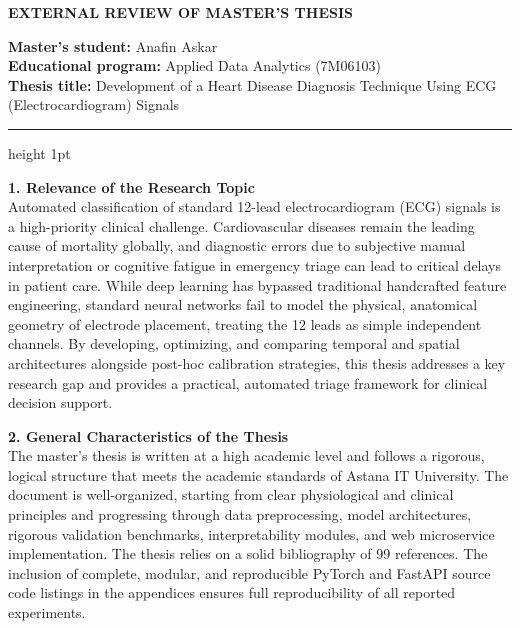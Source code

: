 \documentclass[12pt,a4paper]{article}
\begin{document}
\begin{center}
    \bfseries\large
    EXTERNAL REVIEW OF MASTER'S THESIS
\end{center}
\vspace{1em}

\noindent
\textbf{Master's student:} Anafin Askar \\
\textbf{Educational program:} Applied Data Analytics (7M06103) \\
\textbf{Thesis title:} Development of a Heart Disease Diagnosis Technique Using ECG (Electrocardiogram) Signals \\

\hrule height 1pt
\vspace{1.5em}

\noindent
\textbf{1. Relevance of the Research Topic} \\
Automated classification of standard 12-lead electrocardiogram (ECG) signals is a high-priority clinical challenge. Cardiovascular diseases remain the leading cause of mortality globally, and diagnostic errors due to subjective manual interpretation or cognitive fatigue in emergency triage can lead to critical delays in patient care. While deep learning has bypassed traditional handcrafted feature engineering, standard neural networks fail to model the physical, anatomical geometry of electrode placement, treating the 12 leads as simple independent channels. By developing, optimizing, and comparing temporal and spatial architectures alongside post-hoc calibration strategies, this thesis addresses a key research gap and provides a practical, automated triage framework for clinical decision support.
\vspace{1em}

\noindent
\textbf{2. General Characteristics of the Thesis} \\
The master's thesis is written at a high academic level and follows a rigorous, logical structure that meets the academic standards of Astana IT University. The document is well-organized, starting from clear physiological and clinical principles and progressing through data preprocessing, model architectures, rigorous validation benchmarks, interpretability modules, and web microservice implementation. The thesis relies on a solid bibliography of 99 references. The inclusion of complete, modular, and reproducible PyTorch and FastAPI source code listings in the appendices ensures full reproducibility of all reported experiments.
\vspace{1em}
\end{document}
